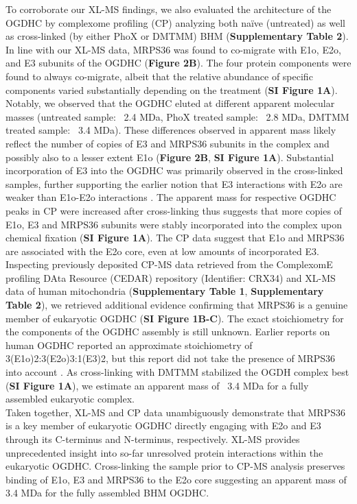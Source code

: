 \documentclass[times, twoside]{zHenriquesLab-StyleBioRxiv}
\begin{document}
To corroborate our XL-MS findings, we also evaluated the architecture of the OGDHC by complexome profiling (CP) analyzing both naïve (untreated) as well as cross-linked (by either PhoX or DMTMM) BHM (\textbf{Supplementary Table 2}). In line with our XL-MS data, MRPS36 was found to co-migrate with E1o, E2o, and E3 subunits of the OGDHC (\textbf{Figure 2B}). The four protein components were found to always co-migrate, albeit that the relative abundance of specific components varied substantially depending on the treatment (\textbf{SI Figure 1A}). Notably, we observed that the OGDHC eluted at different apparent molecular masses (untreated sample: ~2.4 MDa, PhoX treated sample: ~2.8 MDa, DMTMM treated sample: ~3.4 MDa). These differences observed in apparent mass likely reflect the number of copies of E3 and MRPS36 subunits in the complex and possibly also to a lesser extent E1o (\textbf{Figure 2B}, \textbf{SI Figure 1A}). Substantial incorporation of E3 into the OGDHC was primarily observed in the cross-linked samples, further supporting the earlier notion that E3 interactions with E2o are weaker than E1o-E2o interactions \cite{Zhou_2018}. The apparent mass for respective OGDHC peaks in CP were increased after cross-linking thus suggests that more copies of E1o, E3 and MRPS36 subunits were stably incorporated into the complex upon chemical fixation (\textbf{SI Figure 1A}). The CP data suggest that E1o and MRPS36 are associated with the E2o core, even at low amounts of incorporated E3. Inspecting previously deposited CP-MS data retrieved from the ComplexomE profiling DAta Resource (CEDAR) repository \cite{Strien_2021} (Identifier: CRX34) and XL-MS data of human mitochondria \cite{Ryl_2020} (\textbf{Supplementary Table 1}, \textbf{Supplementary Table 2}), we retrieved additional evidence confirming that MRPS36 is a genuine member of eukaryotic OGDHC (\textbf{SI Figure 1B-C}). The exact stoichiometry for the components of the OGDHC assembly is still unknown. Earlier reports on human OGDHC reported an approximate stoichiometry of 3(E1o)2:3(E2o)3:1(E3)2, but this report did not take the presence of MRPS36 into account \cite{Zhou_2018}. As cross-linking with DMTMM stabilized the OGDH complex best (\textbf{SI Figure 1A}), we estimate an apparent mass of ~3.4 MDa for a fully assembled eukaryotic complex.\\ 
Taken together, XL-MS and CP data unambiguously demonstrate that MRPS36 is a key member of eukaryotic OGDHC directly engaging with E2o and E3 through its C-terminus and N-terminus, respectively. XL-MS provides unprecedented insight into so-far unresolved protein interactions within the eukaryotic OGDHC. Cross-linking the sample prior to CP-MS analysis preserves binding of E1o, E3 and MRPS36 to the E2o core suggesting an apparent mass of 3.4 MDa for the fully assembled BHM OGDHC.
\end{document}

